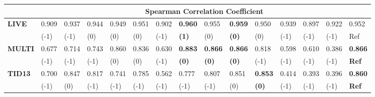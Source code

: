 \documentclass[draftcls,12pt, onecolumn]{IEEEtran}
\begin{document}
\begin{center}
\begin{table*}[htbp!]
\begin{tabular}{p{0.9cm}|p{0.63cm}|p{0.63cm}|p{0.63cm}|p{0.63cm}|p{0.63cm}|p{0.63cm}|p{0.63cm}|p{0.60cm}|p{0.75cm}|p{0.75cm}|p{0.63cm}|p{0.63cm}|p{0.63cm}|p{0.9cm}}
\textbf{}      & \multicolumn{14}{c}{\textbf{Spearman Correlation Coefficient}}                                                                                                                                                                        \\ \hline
 

\multirow{2}{*}{{\bf LIVE}}             &0.909                &0.937                 &0.944                 &              0.949  & 0.951                 & 0.902                  & \bf 0.960                 & 0.955                        & \bf 0.959              & 0.950      &   0.939    &0.897 &0.922    &0.952                 \\ &(-1)               &(-1)                 & (0)                  &              (0) &  (0)                 &  (-1)                 & \bf  (1)                 & (0)                         & \bf  (0)            & (0)       &   (-1)   &(-1)  &(-1) & Ref      \\  
               
         





\multirow{2}{*}{{\bf MULTI}}            &0.677              & 0.714                 & 0.743                  &              0.860  &0.836                  & 0.630                &\bf 0.883                  &                \bf 0.866                            & \bf 0.866               &  0.818      & 0.598  &0.610 &0.386 &\bf 0.866   \\  &(-1)              & (-1)                 & (-1)                  & (0)  & (0)                  & (-1)                &\bf  (0)                  &                \bf  (0)                            & \bf  (0)               &    (-1)    &  (-1)  &(-1) &(-1)  &\bf Ref        \\  
               
         



\multirow{2}{*}{{\bf TID13}}          & 0.700              & 0.847                 & 0.817                  &0.741        &0.785                & 0.562               & 0.777              &0.807             &0.851                             &\bf 0.853      & 0.414   &0.393   &0.396  &\bf 0.860  
   \\  & (-1)              & (0)                 &  (-1)                  & (-1)        & (-1)                & (-1)               &  (-1)              &  (-1)             & (0)                             &\bf (0)           &  (-1) &(-1) &(-1) &\bf Ref                        
     \\ \hline 
               
         


\end{tabular}
\end{table*} \end{center}
\end{document}
